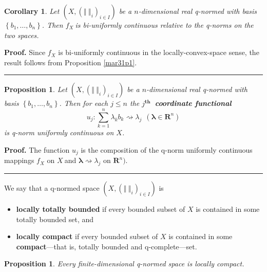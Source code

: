 \documentclass[11pt]{article}%
\newtheorem{corollary}[theorem]{Corollary}
\newtheorem{proposition}[theorem]{Proposition}
\newenvironment{proof}[1][Proof]{\noindent\textbf{#1.} }{\ \rule{0.5em}{0.5em}}
\begin{document}
\begin{corollary}
\label{mar31c1}Let $\left(  X,\left(  \left\Vert \ \right\Vert _{i}\right)
_{i\in I}\right)  $ be a $n$-dimensional real q-normed with basis $\left\{
b_{1},\ldots,b_{n}\right\}  $. Then $f_{X}\ $is bi-uniformly continuous
relative to the q-norms on the two spaces.
\end{corollary}

\begin{proof}
Since $f_{X}$ is bi-uniformly continuous in the locally-convex-space sense,
the result follows from Proposition \ref{mar31p1}.
\end{proof}

\begin{proposition}
\label{mar31p2}Let $\left(  X,\left(  \left\Vert \ \right\Vert _{i}\right)
_{i\in I}\right)  $ be a $n$-dimensional real q-normed with basis $\left\{
b_{1},\ldots,b_{n}\right\}  $. Then for each $j\leq n$ the $j^{\mathbf{th}}%
$\textbf{\ coordinate functional}%
\[
u_{j}:\sum_{k=1}^{n}\lambda_{k}b_{k}\rightsquigarrow\lambda_{j}%
\ \ (\mathbf{\lambda}\in\mathbf{R}^{n})
\]
is q-norm uniformly continuous on $X$.
\end{proposition}

\begin{proof}
The function $u_{j}$ is the composition of the q-norm uniformly continuous
mappings $f_{X}$ on $X\ $and $\mathbf{\lambda}\rightsquigarrow\lambda_{j}$ on
$\mathbf{R}^{n})$.
\end{proof}

%

\medskip


We say that a q-normed space $\left(  X,\left(  \left\Vert \ \right\Vert
_{i}\right)  _{i\in I}\right)  $ is

\begin{itemize}
\item[--] \textbf{locally totally bounded }if every bounded subset of $X$ is
contained in some totally bounded set, and

\item[--] \textbf{locally compact} if every bounded subset of $X$ is contained
in some \textbf{compact}---that is, totally bounded and q-complete---set.
\end{itemize}

\begin{proposition}
\label{mar31p3}Every finite-dimensional q-normed space is locally compact.
\end{proposition}
\end{document}
